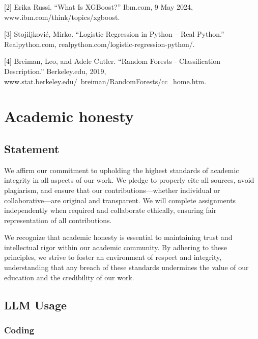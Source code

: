 \documentclass[11pt,letterpaper]{article}
\begin{document}
[2] Erika Russi. “What Is XGBoost?” Ibm.com, 9 May 2024, www.ibm.com/think/topics/xgboost.

[3] Stojiljković, Mirko. “Logistic Regression in Python – Real Python.” Realpython.com, realpython.com/logistic-regression-python/.

[4] Breiman, Leo, and Adele Cutler. “Random Forests - Classification Description.” Berkeley.edu, 2019, www.stat.berkeley.edu/~breiman/RandomForests/cc\_home.htm.


\appendix

\vspace{1em} %
\section{Academic honesty}

\vspace{1em} %
\subsection{Statement}
\vspace{0.5em} %

We affirm our commitment to upholding the highest standards of academic integrity in all aspects of our work. We pledge to properly cite all sources, avoid plagiarism, and ensure that our contributions—whether individual or collaborative—are original and transparent. We will complete assignments independently when required and collaborate ethically, ensuring fair representation of all contributions.

We recognize that academic honesty is essential to maintaining trust and intellectual rigor within our academic community. By adhering to these principles, we strive to foster an environment of respect and integrity, understanding that any breach of these standards undermines the value of our education and the credibility of our work.


\vspace{1em} %
\subsection{LLM Usage}
\vspace{0.5em} %

\vspace{1em} %
\subsubsection*{Coding}
\vspace{0.5em} %
\end{document}

